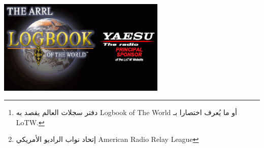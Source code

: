 \documentclass[a4paper,12pt]{article}
\begin{document}
	
	\thispagestyle{plain} %
\newpage



\begin{center}
\includegraphics[width=0.6\textwidth]{LOTW_Banner.eps}
\end{center}


\begin{abstract}
	
	\hspace{-70pt}\marginnote[left]{\fontsize{100}{30}\selectfont\decotwo}[-15pt]
	
	هذه الوثيقة عبارة عن ترجمة للخطوات وطريقة التسجيل في دفتر سجلات العالم \textenglish{Logbook of The World (LoTW)}\footnote{دفتر سجلات العالم يقصد به \textenglish{Logbook of The World} أو ما يُعرف اختصارا بـ \textenglish{LoTW}.} الموجودة على موقع \href{http://www.arrl.org/}{\textenglish{\footnote{إتحاد نواب الراديو الأمريكي \textenglish{American Radio Relay League}}ARRL}} والذي يختص بتوثيق الإتصالات \textenglish{QSOs} بين الهواة بطريقة آمنة و محمية ويستخدمها معظم الهواة 
	المحترفين.\\
	حاولت تبسيط الترجمة والخطوات لتكون سهلة وواضحة للجميع قدر الإمكان ولكن إن أخطأت فمن نفسي وأرجوا أن تستميحوا لي العذر وتراسلوني عبر الموقع الموجود في أول صفحة أسفل العنوان.
\\
\begin{flushleft}
\textenglish{\textbf{Disclaimer:} This document is a personal effort by \emph{HZ1YR} in translating ARRL's article on how to register for LoTW. All ARRL images are {\large{\copyright}} copyrighted to ARRL.}
\end{flushleft}

\end{abstract}


\begin{center}
	\color{slategray2}
{\Huge\decoone}
\end{center}
	
\end{document}
